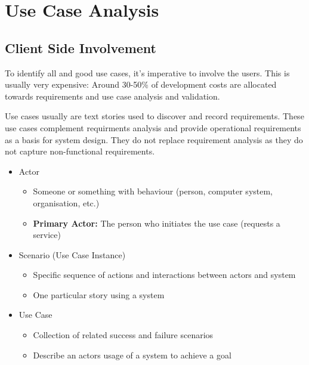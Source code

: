 \documentclass[
../../Software_Engineering_Summary.tex,
]
{subfiles}
\begin{document}
\section{Use Case Analysis}
\subsection{Client Side Involvement}
To identify all and good use cases, it's imperative to involve the users. This is usually very expensive: Around 30-50\% of development costs are allocated towards requirements and use case analysis and validation.

Use cases usually are text stories used to discover and record requirements. These use cases complement requirments analysis and provide operational requirements as a basis for system design. They do not replace requirement analysis as they do not capture non-functional requirements.

\begin{defbox}
    \begin{itemize}
        \item Actor
        \begin{itemize}
            \item Someone or something with behaviour (person, computer system, organisation, etc.)
            \item \textbf{Primary Actor:} The person who initiates the use case (requests a service)
        \end{itemize}
        \item Scenario (Use Case Instance)
        \begin{itemize}
            \item Specific sequence of actions and interactions between actors and system
            \item One particular story using a system
        \end{itemize}
        \item Use Case
        \begin{itemize}
            \item Collection of related success and failure scenarios 
            \item Describe an actors usage of a system to achieve a goal
        \end{itemize}
    \end{itemize}
\end{defbox}
\end{document}
